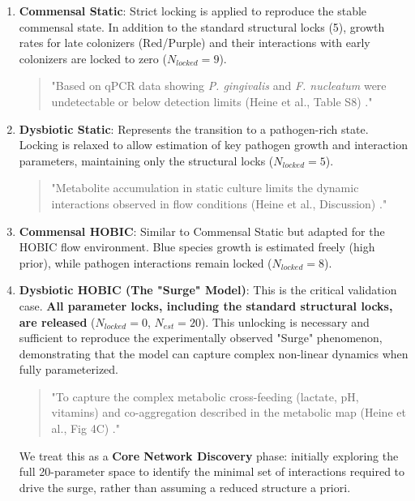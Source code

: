 \documentclass[11pt,a4paper]{article}
\begin{document}
\begin{enumerate}
    \item \textbf{Commensal Static}:
    Strict locking is applied to reproduce the stable commensal state. In addition to the standard structural locks (5), growth rates for late colonizers (Red/Purple) and their interactions with early colonizers are locked to zero ($N_{locked}=9$).
    \begin{quote}
    \small "Based on qPCR data showing \textit{P. gingivalis} and \textit{F. nucleatum} were undetectable or below detection limits (Heine et al., Table S8) \cite{Heine2025PeriImplant}."
    \end{quote}

    \item \textbf{Dysbiotic Static}:
    Represents the transition to a pathogen-rich state. Locking is relaxed to allow estimation of key pathogen growth and interaction parameters, maintaining only the structural locks ($N_{locked}=5$).
    \begin{quote}
    \small "Metabolite accumulation in static culture limits the dynamic interactions observed in flow conditions (Heine et al., Discussion) \cite{Heine2025PeriImplant}."
    \end{quote}

    \item \textbf{Commensal HOBIC}:
    Similar to Commensal Static but adapted for the HOBIC flow environment. Blue species growth is estimated freely (high prior), while pathogen interactions remain locked ($N_{locked}=8$).

    \item \textbf{Dysbiotic HOBIC (The "Surge" Model)}:
    This is the critical validation case. \textbf{All parameter locks, including the standard structural locks, are released} ($N_{locked}=0$, $N_{est}=20$). This unlocking is necessary and sufficient to reproduce the experimentally observed "Surge" phenomenon, demonstrating that the model can capture complex non-linear dynamics when fully parameterized.
    \begin{quote}
    \small "To capture the complex metabolic cross-feeding (lactate, pH, vitamins) and co-aggregation described in the metabolic map (Heine et al., Fig 4C) \cite{Heine2025PeriImplant}."
    \end{quote}
    We treat this as a \textbf{Core Network Discovery} phase: initially exploring the full 20-parameter space to identify the minimal set of interactions required to drive the surge, rather than assuming a reduced structure a priori.
\end{enumerate}
\end{document}
